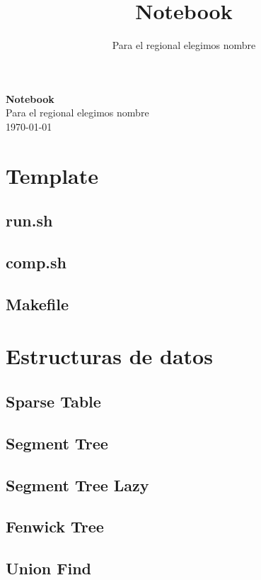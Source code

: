 \documentclass[a4paper,11pt,landscape,twocolumn]{article}
\title{Notebook}
\author{Para el regional elegimos nombre}
\begin{document}
\begin{center}
    \LARGE\textbf{Notebook}\\[1em]
    \large Para el regional elegimos nombre\\[1em]
    \normalsize \today\\[1em]
\end{center}

\tableofcontents

\section{Template} %

\subsection{run.sh}

\subsection{comp.sh}

\subsection{Makefile}


\section{Estructuras de datos} %
\subsection{Sparse Table}

\subsection{Segment Tree}

\subsection{Segment Tree Lazy}

\subsection{Fenwick Tree}

\subsection{Union Find}

\end{document}
